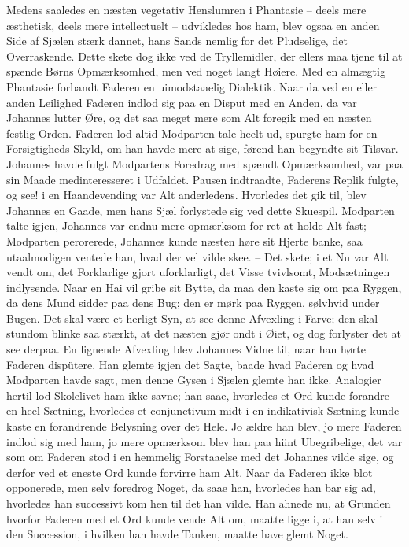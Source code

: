 \documentclass[12pt,a4paper]{article}
\begin{document}
Medens saaledes en næsten vegetativ Henslumren i Phantasie – deels mere æsthetisk, deels mere intellectuelt – udvikledes hos ham, blev ogsaa en anden Side af Sjælen stærk dannet, hans Sands nemlig for det Pludselige, det Overraskende. Dette skete dog ikke ved de Tryllemidler, der ellers maa tjene til at spænde Børns Opmærksomhed, men ved noget langt Høiere. Med en almægtig Phantasie forbandt Faderen en uimodstaaelig Dialektik. Naar da ved en eller anden Leilighed Faderen indlod sig paa en Disput med en Anden, da var Johannes lutter Øre, og det saa meget mere som Alt foregik med en næsten festlig Orden. Faderen lod altid Modparten tale heelt ud, spurgte ham for en Forsigtigheds Skyld, om han havde mere at sige, førend han begyndte sit Tilsvar. Johannes havde fulgt Modpartens Foredrag med spændt Opmærksomhed, var paa sin Maade medinteresseret i Udfaldet. Pausen indtraadte, Faderens Replik fulgte, og see! i en Haandevending var Alt anderledens. Hvorledes det gik til, blev Johannes en Gaade, men hans Sjæl forlystede sig ved dette Skuespil. Modparten talte igjen, Johannes var endnu mere opmærksom for ret at holde Alt fast; Modparten perorerede, Johannes kunde næsten høre sit Hjerte banke, saa utaalmodigen ventede han, hvad der vel vilde skee. – Det skete; i et Nu var Alt vendt om, det Forklarlige gjort uforklarligt, det Visse tvivlsomt, Modsætningen indlysende. Naar en Hai vil gribe sit Bytte, da maa den kaste sig om paa Ryggen, da dens Mund sidder paa dens Bug; den er mørk paa Ryggen, sølvhvid under Bugen. Det skal være et herligt Syn, at see denne Afvexling i Farve; den skal stundom blinke saa stærkt, at det næsten gjør ondt i Øiet, og dog forlyster det at see derpaa. En lignende Afvexling blev Johannes Vidne til, naar han hørte Faderen dispütere. Han glemte igjen det Sagte, baade hvad Faderen og hvad Modparten havde sagt, men denne Gysen i Sjælen glemte han ikke. Analogier hertil lod Skolelivet ham ikke savne; han saae, hvorledes et Ord kunde forandre en heel Sætning, hvorledes et conjunctivum midt i en indikativisk Sætning kunde kaste en forandrende Belysning over det Hele. Jo ældre han blev, jo mere Faderen indlod sig med ham, jo mere opmærksom blev han paa hiint Ubegribelige, det var som om Faderen stod i en hemmelig Forstaaelse med det Johannes vilde sige, og derfor ved et eneste Ord kunde forvirre ham Alt. Naar da Faderen ikke blot opponerede, men selv foredrog Noget, da saae han, hvorledes han bar sig ad, hvorledes han successivt kom hen til det han vilde. Han ahnede nu, at Grunden hvorfor Faderen med et Ord kunde vende Alt om, maatte ligge i, at han selv i den Succession, i hvilken han havde Tanken, maatte have glemt Noget.
\end{document}
